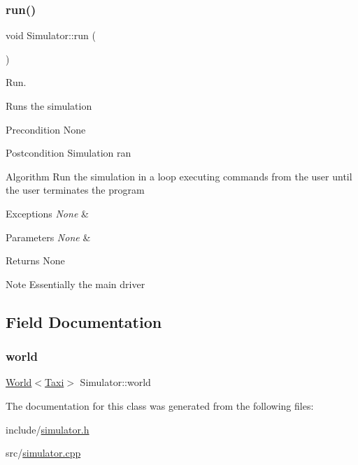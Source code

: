 \subsubsection{\texorpdfstring{run()}{run()}}
{\footnotesize\ttfamily void Simulator\+::run (\begin{DoxyParamCaption}{ }\end{DoxyParamCaption})}



Run. 

Runs the simulation

\begin{DoxyPrecond}{Precondition}
None
\end{DoxyPrecond}
\begin{DoxyPostcond}{Postcondition}
Simulation ran
\end{DoxyPostcond}
\begin{DoxyParagraph}{Algorithm}
Run the simulation in a loop executing commands from the user until the user terminates the program
\end{DoxyParagraph}

\begin{DoxyExceptions}{Exceptions}
{\em None} & \\
\hline
\end{DoxyExceptions}

\begin{DoxyParams}{Parameters}
{\em None} & \\
\hline
\end{DoxyParams}
\begin{DoxyReturn}{Returns}
None
\end{DoxyReturn}
\begin{DoxyNote}{Note}
Essentially the main driver 
\end{DoxyNote}


\subsection{Field Documentation}
\hypertarget{class_simulator_abc90be746b475a15bf194f5e49be36a7}{}\label{class_simulator_abc90be746b475a15bf194f5e49be36a7} 
\subsubsection{\texorpdfstring{world}{world}}
{\footnotesize\ttfamily \hyperlink{class_world}{World}$<$\hyperlink{class_taxi}{Taxi}$>$ Simulator\+::world\hspace{0.3cm}{\ttfamily [private]}}



The documentation for this class was generated from the following files\+:\begin{DoxyCompactItemize}
\item 
include/\hyperlink{simulator_8h}{simulator.\+h}\item 
src/\hyperlink{simulator_8cpp}{simulator.\+cpp}\end{DoxyCompactItemize}
